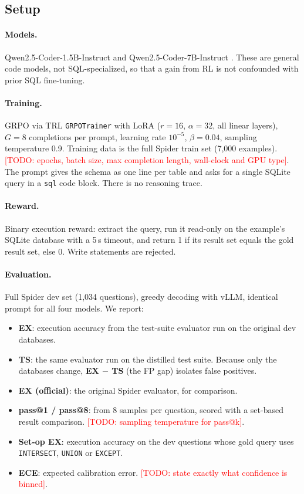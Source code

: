 \documentclass[11pt]{article}
\newcommand{\todo}[1]{\textcolor{red}{[TODO: #1]}}
\begin{document}
\subsection{Setup}

\paragraph{Models.} Qwen2.5-Coder-1.5B-Instruct and Qwen2.5-Coder-7B-Instruct
\citep{hui2024qwen25coder}. These are general code models, not SQL-specialized,
so that a gain from RL is not confounded with prior SQL fine-tuning.

\paragraph{Training.} GRPO via TRL \texttt{GRPOTrainer} with LoRA
\citep{hu2021lora} ($r=16$, $\alpha=32$, all linear layers), $G=8$ completions
per prompt, learning rate $10^{-5}$, $\beta=0.04$, sampling temperature 0.9.
Training data is the full Spider train set (7{,}000 examples).
\todo{epochs, batch size, max completion length, wall-clock and GPU type}.
The prompt gives the schema as one line per table and asks for a single SQLite
query in a \texttt{sql} code block. There is no reasoning trace.

\paragraph{Reward.} Binary execution reward: extract the query, run it read-only
on the example's SQLite database with a 5\,s timeout, and return 1 if its result
set equals the gold result set, else 0. Write statements are rejected.

\paragraph{Evaluation.} Full Spider dev set (1{,}034 questions), greedy decoding
with vLLM, identical prompt for all four models. We report:
\begin{itemize}
  \item \textbf{EX}: execution accuracy from the test-suite evaluator
        \citep{zhong2020testsuite} run on the original dev databases.
  \item \textbf{TS}: the same evaluator run on the distilled test suite. Because
        only the databases change, \textbf{EX $-$ TS} (the FP gap) isolates false positives.
  \item \textbf{EX (official)}: the original Spider evaluator, for comparison.
  \item \textbf{pass@1 / pass@8}: from 8 samples per question, scored with a
        set-based result comparison. \todo{sampling temperature for pass@k}.
  \item \textbf{Set-op EX}: execution accuracy on the \SetOpN{} dev questions whose
        gold query uses \texttt{INTERSECT}, \texttt{UNION} or \texttt{EXCEPT}.
  \item \textbf{ECE}: expected calibration error. \todo{state exactly what confidence is binned}.
\end{itemize}
\end{document}
